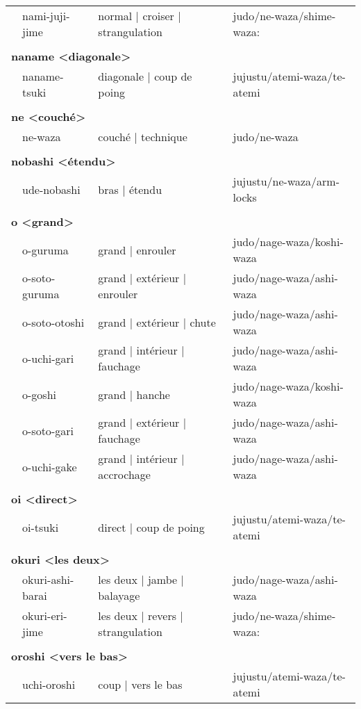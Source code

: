 \documentclass{article}%
\begin{document}
\begin{longtable}{rlll}
&nami{-}juji{-}jime&normal | croiser | strangulation&judo/ne{-}waza/shime{-}waza:\\%
&&&\\%
\multicolumn{3}{l}{\textbf{naname <diagonale>}%
~%
}&\\%
&naname{-}tsuki&diagonale | coup de poing&jujustu/atemi{-}waza/te{-}atemi\\%
&&&\\%
\multicolumn{3}{l}{\textbf{ne <couché>}%
~%
}&\\%
&ne{-}waza&couché | technique&judo/ne{-}waza\\%
&&&\\%
\multicolumn{3}{l}{\textbf{nobashi <étendu>}%
~%
}&\\%
&ude{-}nobashi&bras | étendu&jujustu/ne{-}waza/arm{-}locks\\%
&&&\\%
\multicolumn{3}{l}{\textbf{o <grand>}%
~%
}&\\%
&o{-}guruma&grand | enrouler&judo/nage{-}waza/koshi{-}waza\\%
&o{-}soto{-}guruma&grand | extérieur | enrouler&judo/nage{-}waza/ashi{-}waza\\%
&o{-}soto{-}otoshi&grand | extérieur | chute&judo/nage{-}waza/ashi{-}waza\\%
&o{-}uchi{-}gari&grand | intérieur | fauchage&judo/nage{-}waza/ashi{-}waza\\%
&o{-}goshi&grand | hanche&judo/nage{-}waza/koshi{-}waza\\%
&o{-}soto{-}gari&grand | extérieur | fauchage&judo/nage{-}waza/ashi{-}waza\\%
&o{-}uchi{-}gake&grand | intérieur | accrochage&judo/nage{-}waza/ashi{-}waza\\%
&&&\\%
\multicolumn{3}{l}{\textbf{oi <direct>}%
~%
}&\\%
&oi{-}tsuki&direct | coup de poing&jujustu/atemi{-}waza/te{-}atemi\\%
&&&\\%
\multicolumn{3}{l}{\textbf{okuri <les deux>}%
~%
}&\\%
&okuri{-}ashi{-}barai&les deux | jambe | balayage&judo/nage{-}waza/ashi{-}waza\\%
&okuri{-}eri{-}jime&les deux | revers | strangulation&judo/ne{-}waza/shime{-}waza:\\%
&&&\\%
\multicolumn{3}{l}{\textbf{oroshi <vers le bas>}%
~%
}&\\%
&uchi{-}oroshi&coup | vers le bas&jujustu/atemi{-}waza/te{-}atemi\\%

\end{longtable}
\end{document}
